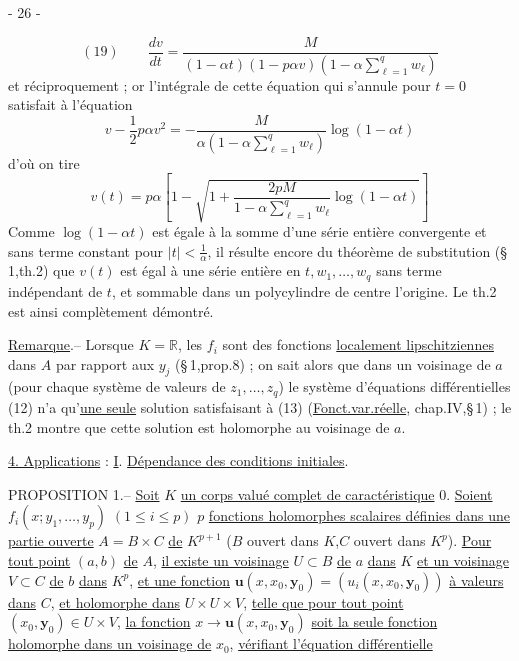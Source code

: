 
\begin{center}- 26 -\end{center}

\[
(19)\qquad
\frac{dv}{dt}=
\frac{M}{(1-\alpha t)(1-p\alpha v)(1-\alpha\sum_{\ell=1}^{q}w_\ell)}
\]
et réciproquement ; or l'intégrale de cette équation qui s'annule pour $t=0$ satisfait à l'équation
\[
v-\frac12p\alpha v^2=
-\frac{M}{\alpha(1-\alpha\sum_{\ell=1}^{q}w_\ell)}\log(1-\alpha t)
\]
d'où on tire
\[
v(t)=p\alpha\left[1-\sqrt{1+\frac{2pM}{1-\alpha\sum_{\ell=1}^{q}w_\ell}
\log(1-\alpha t)}\right]
\]
Comme $\log(1-\alpha t)$ est égale à la somme d'une série entière convergente et sans terme constant pour $|t|<\frac1\alpha$, il résulte encore du théorème de substitution (\S\,1,th.2) que $v(t)$ est égal à une série entière en $t,w_1,\ldots,w_q$ sans terme indépendant de $t$, et sommable dans un polycylindre de centre l'origine. Le th.2 est ainsi complètement démontré.

\uline{Remarque}.-- Lorsque $K=\mathbb R$, les $f_i$ sont des fonctions \uline{localement lipschitziennes} dans $A$ par rapport aux $y_j$ (\S\,1,prop.8) ; on sait alors que dans un voisinage de $a$ (pour chaque système de valeurs de $z_1,\ldots,z_q$) le système d'équations différentielles (12) n'a qu'\uline{une seule} solution satisfaisant à (13) (\uline{Fonct.var.réelle}, chap.IV,\S\,1) ; le th.2 montre que cette solution est holomorphe au voisinage de $a$.

\uline{4. Applications} : \uline{I}. \uline{Dépendance des conditions initiales}.

PROPOSITION 1.-- \uline{Soit} $K$ \uline{un corps valué complet de caractéristique} $0$.
\uline{Soient} $f_i(x;y_1,\ldots,y_p)$ $(1\leq i\leq p)$ $p$ \uline{fonctions holomorphes scalaires définies dans une partie ouverte}
$A=B\times C$ \uline{de} $K^{p+1}$ ($B$ ouvert dans $K$,$C$ ouvert dans $K^p$).
\uline{Pour tout point} $(a,b)$ \uline{de} $A$, \uline{il existe un voisinage} $U\subset B$ \uline{de} $a$ \uline{dans} $K$ \uline{et un voisinage} $V\subset C$ \uline{de} $b$ \uline{dans} $K^p$, \uline{et une fonction} $\mathbf{u}(x,x_0,\mathbf{y}_0)=(u_i(x,x_0,\mathbf{y}_0))$ \uline{à valeurs dans} $C$, \uline{et holomorphe dans} $U\times U\times V$, \uline{telle que pour tout point} $(x_0,\mathbf{y}_0)\in U\times V$, \uline{la fonction}
$x\longrightarrow \mathbf{u}(x,x_0,\mathbf{y}_0)$ \uline{soit la seule fonction holomorphe dans un voisinage de} $x_0$, \uline{vérifiant l'équation différentielle}
